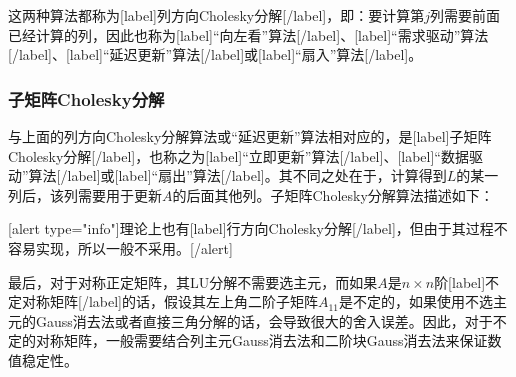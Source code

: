 \documentclass[UTF8,nofonts]{ctexart}
\begin{document}
这两种算法都称为[label]列方向Cholesky分解[/label]，即：要计算第$j$列需要前面已经计算的列，因此也称为[label]“向左看”算法[/label]、[label]“需求驱动”算法[/label]、[label]“延迟更新”算法[/label]或[label]“扇入”算法[/label]。

\subsubsection*{子矩阵Cholesky分解}

与上面的列方向Cholesky分解算法或“延迟更新”算法相对应的，是[label]子矩阵Cholesky分解[/label]，也称之为[label]“立即更新”算法[/label]、[label]“数据驱动”算法[/label]或[label]“扇出”算法[/label]。其不同之处在于，计算得到$L$的某一列后，该列需要用于更新$A$的后面其他列。子矩阵Cholesky分解算法描述如下：

\begin{algorithm}[H]
\end{algorithm}

[alert type="info"]理论上也有[label]行方向Cholesky分解[/label]，但由于其过程不容易实现，所以一般不采用。[/alert]

最后，对于对称正定矩阵，其LU分解不需要选主元，而如果$A$是$n \times n$阶[label]不定对称矩阵[/label]的话，假设其左上角二阶子矩阵$A_{11}$是不定的，如果使用不选主元的Gauss消去法或者直接三角分解的话，会导致很大的舍入误差。因此，对于不定的对称矩阵，一般需要结合列主元Gauss消去法和二阶块Gauss消去法来保证数值稳定性。

\end{document}
